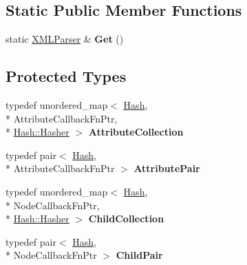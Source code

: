 \subsection*{Static Public Member Functions}
\begin{DoxyCompactItemize}
\item 
\hypertarget{class_k_g_e_1_1_x_m_l_parser_a46ec27146e485e2ec398e2f3efb71160}{static \hyperlink{class_k_g_e_1_1_x_m_l_parser}{X\-M\-L\-Parser} \& {\bfseries Get} ()}\label{class_k_g_e_1_1_x_m_l_parser_a46ec27146e485e2ec398e2f3efb71160}

\end{DoxyCompactItemize}
\subsection*{Protected Types}
\begin{DoxyCompactItemize}
\item 
\hypertarget{class_k_g_e_1_1_x_m_l_parser_adb5323cb08c5f8b16be3f88fdd61c136}{typedef unordered\-\_\-map$<$ \hyperlink{class_k_g_e_1_1_hash}{Hash}, \\*
Attribute\-Callback\-Fn\-Ptr, \\*
\hyperlink{struct_k_g_e_1_1_hash_1_1_hasher}{Hash\-::\-Hasher} $>$ {\bfseries Attribute\-Collection}}\label{class_k_g_e_1_1_x_m_l_parser_adb5323cb08c5f8b16be3f88fdd61c136}

\item 
\hypertarget{class_k_g_e_1_1_x_m_l_parser_a5ea672c2ef8ef37b53cd43a43c482524}{typedef pair$<$ \hyperlink{class_k_g_e_1_1_hash}{Hash}, \\*
Attribute\-Callback\-Fn\-Ptr $>$ {\bfseries Attribute\-Pair}}\label{class_k_g_e_1_1_x_m_l_parser_a5ea672c2ef8ef37b53cd43a43c482524}

\item 
\hypertarget{class_k_g_e_1_1_x_m_l_parser_a1db3e8f2907fe5ab9ebad5b2e2a1cb1d}{typedef unordered\-\_\-map$<$ \hyperlink{class_k_g_e_1_1_hash}{Hash}, \\*
Node\-Callback\-Fn\-Ptr, \\*
\hyperlink{struct_k_g_e_1_1_hash_1_1_hasher}{Hash\-::\-Hasher} $>$ {\bfseries Child\-Collection}}\label{class_k_g_e_1_1_x_m_l_parser_a1db3e8f2907fe5ab9ebad5b2e2a1cb1d}

\item 
\hypertarget{class_k_g_e_1_1_x_m_l_parser_ab376b2722a5630e44bf84597a853c51f}{typedef pair$<$ \hyperlink{class_k_g_e_1_1_hash}{Hash}, \\*
Node\-Callback\-Fn\-Ptr $>$ {\bfseries Child\-Pair}}\label{class_k_g_e_1_1_x_m_l_parser_ab376b2722a5630e44bf84597a853c51f}

\end{DoxyCompactItemize}
